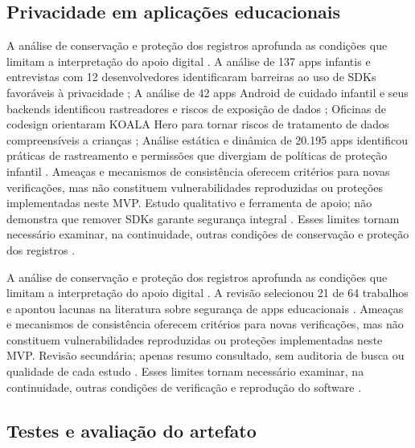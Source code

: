 \clearpage\subsection*{Privacidade em aplicações educacionais}

A análise de conservação e proteção dos registros aprofunda as condições que limitam a interpretação do apoio digital \citep{OS13} \citep{OS14} \citep{OS15} \citep{OS17}. A análise de 137 apps infantis e entrevistas com 12 desenvolvedores identificaram barreiras ao uso de SDKs favoráveis à privacidade \citep{OS13}; A análise de 42 apps Android de cuidado infantil e seus backends identificou rastreadores e riscos de exposição de dados \citep{OS14}; Oficinas de codesign orientaram KOALA Hero para tornar riscos de tratamento de dados compreensíveis a crianças \citep{OS15}; Análise estática e dinâmica de 20.195 apps identificou práticas de rastreamento e permissões que divergiam de políticas de proteção infantil \citep{OS17}. Ameaças e mecanismos de consistência oferecem critérios para novas verificações, mas não constituem vulnerabilidades reproduzidas ou proteções implementadas neste MVP. Estudo qualitativo e ferramenta de apoio; não demonstra que remover SDKs garante segurança integral \citep{OS13} \citep{OS14} \citep{OS15} \citep{OS17}. Esses limites tornam necessário examinar, na continuidade, outras condições de conservação e proteção dos registros \citep{OS13} \citep{OS14} \citep{OS15} \citep{OS17}.

A análise de conservação e proteção dos registros aprofunda as condições que limitam a interpretação do apoio digital \citep{OS18}. A revisão selecionou 21 de 64 trabalhos e apontou lacunas na literatura sobre segurança de apps educacionais \citep{OS18}. Ameaças e mecanismos de consistência oferecem critérios para novas verificações, mas não constituem vulnerabilidades reproduzidas ou proteções implementadas neste MVP. Revisão secundária; apenas resumo consultado, sem auditoria de busca ou qualidade de cada estudo \citep{OS18}. Esses limites tornam necessário examinar, na continuidade, outras condições de verificação e reprodução do software \citep{OS18}.

\clearpage\subsection*{Testes e avaliação do artefato}

